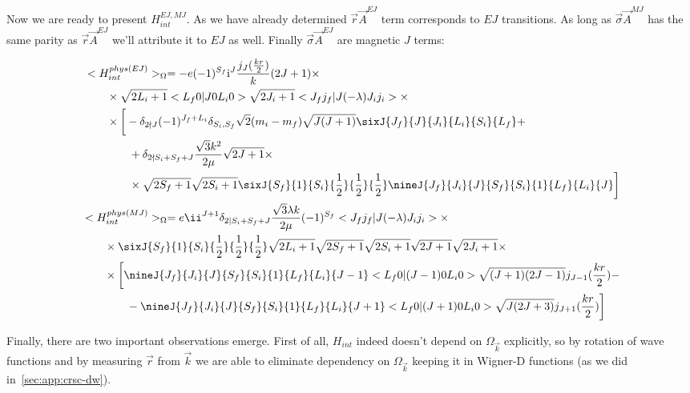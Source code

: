 Now we are ready to present $H_{int}^{EJ, MJ}$. As we have already determined $\vec{r}\vec{A}^{EJ}$ term corresponds to $EJ$ transitions. As long as $\vec{\sigma}\vec{A}^{MJ}$ has the same parity as $\vec{r}\vec{A}^{EJ}$ we'll attribute it to $EJ$ as well. Finally $\vec{\sigma} \vec{A}^{EJ}$ are magnetic $J$ terms:

\begin{align}
    \begin{split}
        &<H_{int}^{phys (EJ)}>_\Omega = -e (-1)^{S_f} \mathrm{i}^{J} \frac{j_J(\frac{k r}{2})}{k} (2J+1) \times \\
        &\qquad\times \sqrt{2L_i + 1} <L_f 0 | J 0 L_i 0> \sqrt{2J_i + 1} <J_f j_f | J (-\lambda) J_i j_i> \times \\
        &\qquad\times \bigg[ -\delta_{2 \nmid J} (-1)^{J_f + L_i} \delta_{S_i, S_f} \sqrt{2}(m_i - m_f) \sqrt{J(J+1)} \sixJ{J_f}{J}{J_i}{L_i}{S_i}{L_f} +\\
        &\qquad\qquad+ \delta_{2 \nmid S_i + S_f + J} \frac{\sqrt{3} k^2}{2 \mu} \sqrt{2J+1} \times \\
        &\qquad\qquad\times \sqrt{2S_f+1} \sqrt{2S_i+1} \sixJ{S_f}{1}{S_i}{\frac{1}{2}}{\frac{1}{2}}{\frac{1}{2}} \nineJ{J_f}{J_i}{J}{S_f}{S_i}{1}{L_f}{L_i}{J} \bigg]
    \end{split} \\
    \begin{split}
        &<H_{int}^{phys (MJ)}>_\Omega = e \ii^{J+1} \delta_{2 \mid S_i+S_f+J} \frac{\sqrt{3} \lambda k}{2 \mu} (-1)^{S_f} <J_f j_f | J (-\lambda) J_i j_i> \times \\
        &\qquad\times \sixJ{S_f}{1}{S_i}{\frac{1}{2}}{\frac{1}{2}}{\frac{1}{2}} \sqrt{2L_i+1} \sqrt{2S_f+1} \sqrt{2S_i+1} \sqrt{2J+1} \sqrt{2J_i + 1} \times\\
        &\qquad\times \bigg[ \nineJ{J_f}{J_i}{J}{S_f}{S_i}{1}{L_f}{L_i}{J-1} <L_f 0 | (J-1) 0 L_i 0> \sqrt{(J+1)(2J-1)} j_{J-1}(\frac{kr}{2}) - \\
        &\qquad\qquad- \nineJ{J_f}{J_i}{J}{S_f}{S_i}{1}{L_f}{L_i}{J+1} <L_f 0 | (J+1) 0 L_i 0> \sqrt{J(2J+3)} j_{J+1}(\frac{kr}{2}) \bigg]
    \end{split}
\end{align}

Finally, there are two important observations emerge. First of all, $H_{int}$ indeed doesn't depend on $\Omega_{\vec{k}}$ explicitly, so by rotation of wave functions and by measuring $\vec{r}$ from $\vec{k}$ we are able to eliminate dependency on $\Omega_{\vec{k}}$ keeping it in Wigner-D functions (as we did in~\cref{sec:app:crsc-dw}).

